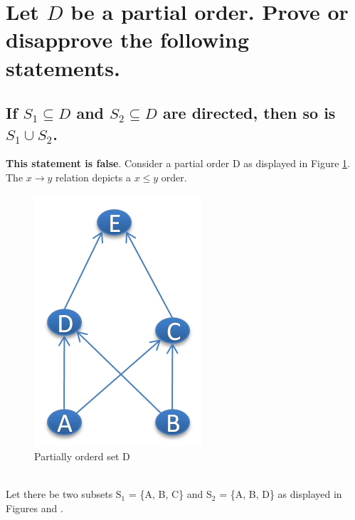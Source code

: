 \section{Let $D$ be a partial order. Prove or disapprove the following statements.}
\subsection{If $S_{1} \subseteq D$ and $S_{2} \subseteq D$ are directed, then so is $S_{1} \cup S_{2}$.}
\textbf{This statement is false}. Consider a partial order D as displayed in Figure \ref{img:ex1a:posetD}. The  $x \rightarrow y$ relation depicts a $x \leq y$ order.
\begin{figure}[htbp]
  \begin{center}
    \includegraphics{exercises/figures/exercise1a-poset-D.png}
    \caption{Partially orderd set D}
    \label{img:ex1a:posetD}
  \end{center}
\end{figure} \\
Let there be two subsets S$_{1}$ = \{A, B, C\} and S$_{2}$ = \{A, B, D\} as displayed in Figures  and .
